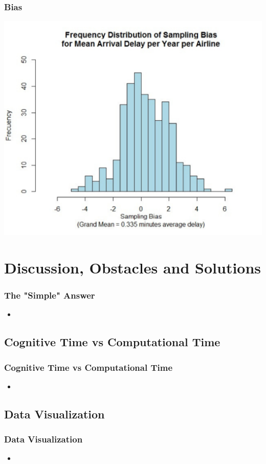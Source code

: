 \documentclass{beamer}
\begin{document}
\begin{frame}
\frametitle{Bias}
\begin{center} 
\includegraphics[width=.7 \textwidth]{bias}
\end{center}

\end{frame}


\section{Discussion, Obstacles and Solutions}
\begin{frame}
\frametitle{The "Simple" Answer}
\begin{itemize}
\item 
\end{itemize}

\end{frame}

\subsection{Cognitive Time vs Computational Time}
\begin{frame}
\frametitle{Cognitive Time vs Computational Time}
\begin{itemize}
\item 
\end{itemize}

\end{frame}

\subsection{Data Visualization}
\begin{frame}
\frametitle{Data Visualization}
\begin{itemize}
\item 
\end{itemize}

\end{frame}
\end{document}
